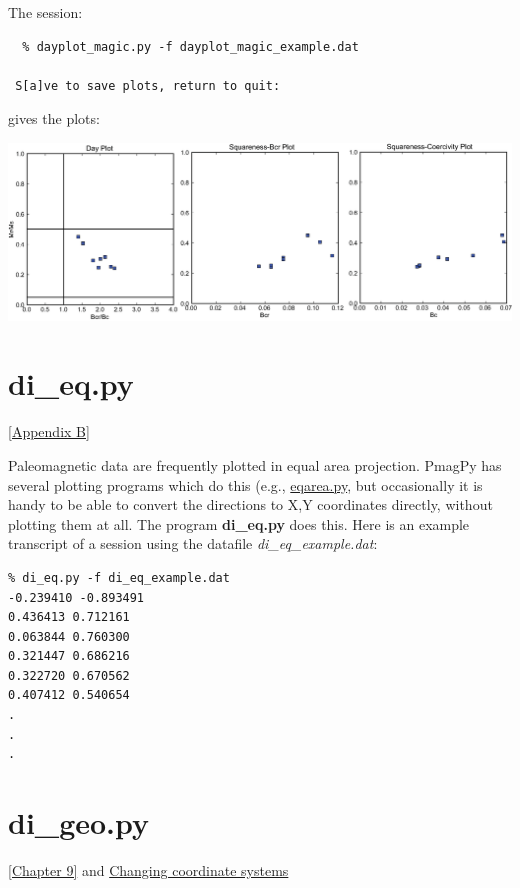 \documentclass[11pt]{book}
\begin{document}
{{{{{ The session:
 
  \begin{verbatim}
  % dayplot_magic.py -f dayplot_magic_example.dat

 S[a]ve to save plots, return to quit:  
\end{verbatim}
 
 
  
\noindent gives the plots:  

{%
  \includegraphics[width=20cm]{EPSfiles/dayplot.eps}}


\section{di\_eq.py}
\href{http://magician.ucsd.edu/Essentials/WebBook2.html#equal_area}{[Appendix B]}
\label{ex:di_eq}

Paleomagnetic data are frequently plotted in equal area projection.  PmagPy has several plotting programs which do this (e.g., \href{#eqarea.py}{eqarea.py}, but occasionally it is handy to be able to convert the directions to X,Y coordinates directly, without plotting them at all.  The program {\bf di\_eq.py} does this.  Here is an example transcript of a session using the datafile {\it di\_eq\_example.dat}:

\begin{verbatim}
% di_eq.py -f di_eq_example.dat
-0.239410 -0.893491
0.436413 0.712161
0.063844 0.760300
0.321447 0.686216
0.322720 0.670562
0.407412 0.540654
.
.
.
\end{verbatim}

\section {\bf di\_geo.py} 
\href{http://magician.ucsd.edu/Essentials/WebBook2.html#Getting_a_paleomagnetic_direction}{[Chapter 9]} and
\href{http://magician.ucsd.edu/Essentials/WebBook2.html#Changing_coordinate_systems}{Changing coordinate systems}
\label{ex:di_geo}

}}}}}
\end{document}

